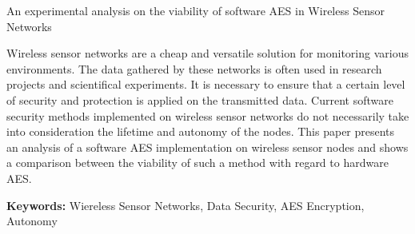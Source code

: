 An experimental analysis on the viability of software AES in Wireless Sensor Networks

Wireless sensor networks are a cheap and versatile solution for monitoring various environments.
The data gathered by these networks is often used in research projects and scientifical experiments.
It is necessary to ensure that a certain level of security and protection is applied on the transmitted 
data. Current software security methods implemented on wireless sensor networks do not necessarily take 
into consideration the lifetime and autonomy of the nodes. This paper presents an analysis of a software 
AES implementation on wireless sensor nodes and shows a comparison between the viability of such a 
method with regard to hardware AES.

\textbf{Keywords:} Wiereless Sensor Networks, Data Security, AES Encryption, Autonomy

